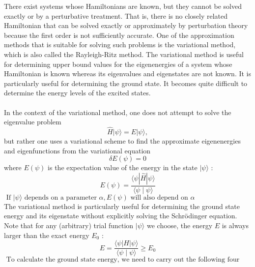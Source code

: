 There exist systems whose Hamiltonians are known, but they cannot be solved exactly or by a perturbative treatment. That is, there is no closely related Hamiltonian that can be solved exactly or approximately by perturbation theory because the first order is not sufficiently accurate. One of the approximation methods that is suitable for solving such problems is the variational method, which is also called the Rayleigh-Ritz method.  The variational method is useful for determining upper bound values for the eigenenergies of a system whose Hamiltonian is known whereas its eigenvalues and eigenstates are not known. It is particularly useful for determining the ground state. It becomes quite difficult to determine the energy levels of the excited states.\\\\
In the context of the variational method, one does not attempt to solve the eigenvalue problem
$$
\hat{H}|\psi\rangle=E|\psi\rangle,
$$
but rather one uses a variational scheme to find the approximate eigenenergies and eigenfunctions from the variational equation
$$
\delta E(\psi)=0
$$
where $E(\psi)$ is the expectation value of the energy in the state $|\psi\rangle$ :
$$
E(\psi)=\frac{\langle\psi|\hat{H}| \psi\rangle}{\langle\psi \mid \psi\rangle}
$$
$\text { If }|\psi\rangle \text { depends on a parameter } \alpha, E(\psi) \text { will also depend on } \alpha$\\
The variational method is particularly useful for determining the ground state energy and its eigenstate without explicitly solving the Schrödinger equation. Note that for any (arbitrary) trial function $|\psi\rangle$ we choose, the energy $E$ is always larger than the exact energy $E_{0}$ :
$$
E=\frac{\langle\psi|H| \psi\rangle}{\langle\psi \mid \psi\rangle} \geq E_{0}
$$
$\text { To calculate the ground state energy, we need to carry out the following four steps: }$

